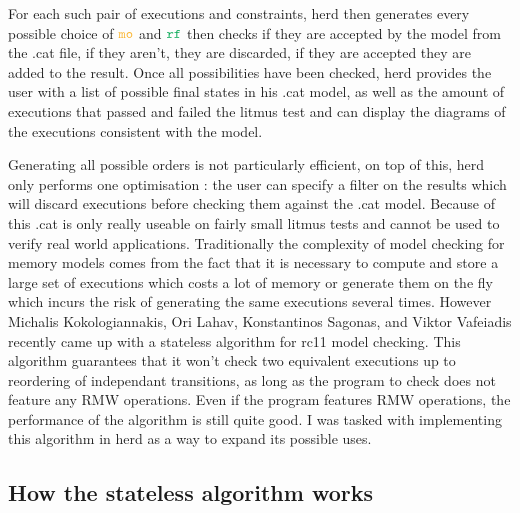 \documentclass[a4,11pt,dvipsnames]{article}
\begin{document}
 For each such pair of executions and constraints, herd then generates every possible choice of $\mo$ and $\rf$ then checks if they are accepted by the model from the .cat file, if they aren't, they are discarded, if they are accepted they are added to the result. Once all possibilities have been checked, herd provides the user with a list of possible final states in his .cat model, as well as the amount of executions that passed and failed the litmus test and can display the diagrams of the executions consistent with the model.




Generating all possible orders is not particularly efficient, on top of this, herd only performs one optimisation : the user can specify a filter on the results which will discard executions before checking them against the .cat model. Because of this .cat is only really useable on fairly small litmus tests and cannot be used to verify real world applications. Traditionally the complexity of model checking for memory models comes from the fact that it is necessary to compute and store a large set of executions which costs a lot of memory or generate them on the fly which incurs the risk of generating the same executions several times. However Michalis Kokologiannakis, Ori Lahav, Konstantinos Sagonas, and Viktor Vafeiadis recently came up with a stateless algorithm for rc11 model checking. This algorithm guarantees that it won't check two equivalent executions up to reordering of independant transitions, as long as the program to check does not feature any RMW operations. Even if the program features RMW operations, the performance of the algorithm is still quite good. I was tasked with implementing this algorithm in herd as a way to expand its possible uses.

\subsection{How the stateless algorithm works}
\end{document}
